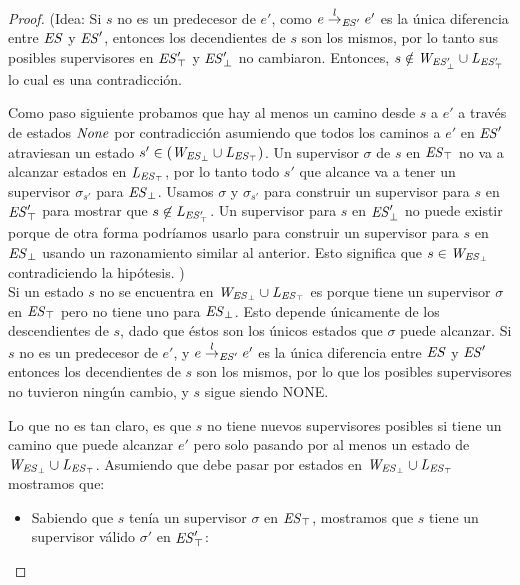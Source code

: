 \begin{proof}
	(Idea: Si $s$ no es un predecesor de $e'$, como $e \overset{l}{\rightarrow}_{\mathit{ES}'} e'$ es la única diferencia entre $\mathit{ES}$ y $\mathit{ES}'$, entonces los decendientes de $s$ son los mismos, 
	por lo tanto sus posibles supervisores en $\mathit{\mathit{ES}'_{\top}}$ y
	$\mathit{\mathit{ES}'_{\bot}}$ no cambiaron. Entonces, $s \notin \mathit{W_{\mathit{\mathit{ES}'_{\bot}}}} \cup 
	\mathit{L_{\mathit{\mathit{ES}'_{\top}}}}$ lo cual es una contradicción.
	
	Como paso siguiente probamos que hay al menos un camino desde $s$ a $e'$ a través de estados $\mathit{None}$ por contradicción asumiendo que todos los caminos a $e'$ en $\mathit{ES}'$ atraviesan un estado $s' \in 
	(\mathit{W_{\mathit{\mathit{ES}_{\bot}}}} \cup \mathit{L_{\mathit{\mathit{ES}_{\top}}}})$. Un supervisor $\sigma$ de $s$ en 
	$\mathit{\mathit{ES}_{\top}}$ no va a alcanzar estados en $\mathit{L_{\mathit{\mathit{ES}_{\top}}}}$, 
	por lo tanto todo $s'$ que alcance va a tener un supervisor $\sigma_{s'}$ para 
	$\mathit{\mathit{ES}_{\bot}}$. Usamos $\sigma$ y $\sigma_{s'}$ para construir un supervisor para $s$ en $\mathit{\mathit{ES}'_{\top}}$ para mostrar que $s 
	\not\in \mathit{L_{\mathit{\mathit{ES}'_{\top}}}}$.
	Un supervisor para $s$ en $\mathit{\mathit{ES}'_{\bot}}$ no puede existir porque de otra forma podríamos usarlo para construir un supervisor para $s$ en 
	$\mathit{\mathit{ES}_{\bot}}$ usando un razonamiento similar al anterior. Esto significa que $s \in 
	\mathit{W_{\mathit{\mathit{ES}_{\bot}}}}$ contradiciendo la hipótesis. )\\


Si un estado $s$ no se encuentra en $\mathit{W_{\mathit{\mathit{ES}_{\bot}}}} \cup \mathit{L_{\mathit{\mathit{ES}_{\top}}}}$ es porque tiene un supervisor $\sigma$ en $\mathit{\mathit{ES}_{\top}}$ pero no tiene uno para $\mathit{\mathit{ES}_{\bot}}$. Esto depende únicamente de los descendientes de $s$, dado que éstos son los únicos estados que $\sigma$ puede alcanzar. Si $s$ no es un predecesor de $e'$, y $e \overset{l}{\rightarrow}_{\mathit{ES}'} e'$ es la única diferencia entre $\mathit{ES}$ y $\mathit{ES}'$ entonces los decendientes de $s$ son los mismos, por lo que los posibles supervisores no tuvieron ningún cambio, y $s$ sigue siendo NONE.

Lo que no es tan claro, es que $s$ no tiene nuevos supervisores posibles si tiene un camino que puede alcanzar $e'$ pero solo pasando por al menos un estado de $\mathit{W_{\mathit{\mathit{ES}_{\bot}}}} \cup \mathit{L_{\mathit{\mathit{ES}_{\top}}}}$. Asumiendo que debe pasar por estados en $\mathit{W_{\mathit{\mathit{ES}_{\bot}}}} \cup \mathit{L_{\mathit{\mathit{ES}_{\top}}}}$ mostramos que:

\begin{itemize}
	\item Sabiendo que $s$ tenía un supervisor $\sigma$ en $\mathit{\mathit{ES}_{\top}}$, mostramos que $s$ tiene un supervisor válido $\sigma'$ en $\mathit{\mathit{ES}'_{\top}}$:
	

\end{itemize}
\end{proof}
